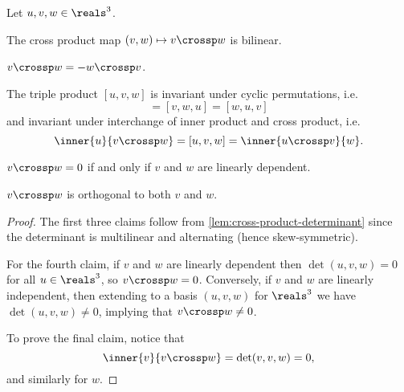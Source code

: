 \documentclass[article, a4paper, 11pt, oneside]{memoir}
\numberwithin{equation}{chapter}
\begin{document}
\begin{proposition}
    Let $u,v,w \in \reals^3$.
    \begin{enumprop}
        \item The cross product map $(v,w) \mapsto v \crossp w$ is bilinear.

        \item $v \crossp w = - w \crossp v$.

        \item The triple product $[u,v,w]$ is invariant under cyclic permutations, i.e.
        \begin{equation*}
            [u,v,w]
                = [v,w,u]
                = [w,u,v]
        \end{equation*}
        and invariant under interchange of inner product and cross product, i.e.
        \begin{equation*}
            \inner{u}{v \crossp w}
                = [u,v,w]
                = \inner{u \crossp v}{w}.
        \end{equation*}

        \item $v \crossp w = 0$ if and only if $v$ and $w$ are linearly dependent.

        \item $v \crossp w$ is orthogonal to both $v$ and $w$.
    \end{enumprop}
\end{proposition}

\begin{proof}
    The first three claims follow from \cref{lem:cross-product-determinant} since the determinant is multilinear and alternating (hence skew-symmetric).
    
    For the fourth claim, if $v$ and $w$ are linearly dependent then $\det(u,v,w) = 0$ for all $u \in \reals^3$, so $v \crossp w = 0$. Conversely, if $v$ and $w$ are linearly independent, then extending to a basis $(u,v,w)$ for $\reals^3$ we have $\det(u,v,w) \neq 0$, implying that $v \crossp w \neq 0$.

    To prove the final claim, notice that
    \begin{equation*}
        \inner{v}{v \crossp w}
            = \det(v,v,w)
            = 0,
    \end{equation*}
    and similarly for $w$.
\end{proof}
\end{document}
